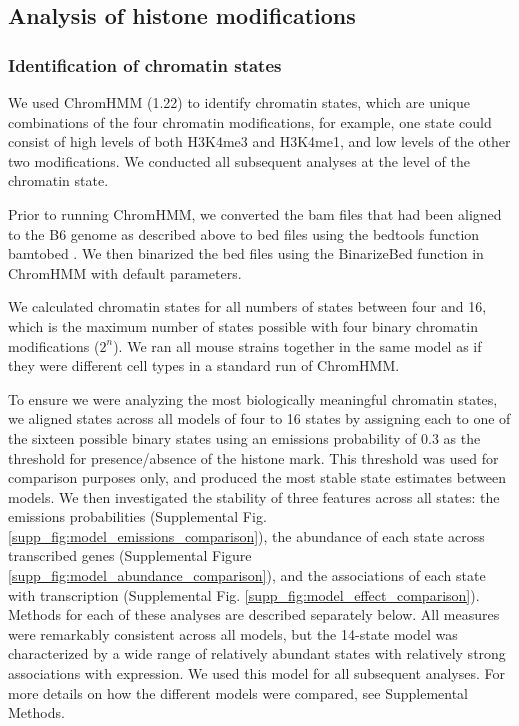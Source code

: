 \documentclass[
  11pt,
]{article}
\begin{document}
\hypertarget{analysis-of-histone-modifications}{%
\subsection{Analysis of histone
modifications}\label{analysis-of-histone-modifications}}

\hypertarget{identification-of-chromatin-states}{%
\subsubsection{Identification of chromatin
states}\label{identification-of-chromatin-states}}

We used ChromHMM (1.22) \citep{pmid29120462} to identify chromatin
states, which are unique combinations of the four chromatin
modifications, for example, one state could consist of high levels of
both H3K4me3 and H3K4me1, and low levels of the other two modifications.
We conducted all subsequent analyses at the level of the chromatin
state.

Prior to running ChromHMM, we converted the bam files that had been
aligned to the B6 genome as described above to bed files using the
bedtools function bamtobed \citep{quinlan2010bedtools}. We then
binarized the bed files using the BinarizeBed function in ChromHMM with
default parameters.

We calculated chromatin states for all numbers of states between four
and 16, which is the maximum number of states possible with four binary
chromatin modifications (\(2^n\)). We ran all mouse strains together in
the same model as if they were different cell types in a standard run of
ChromHMM.

To ensure we were analyzing the most biologically meaningful chromatin
states, we aligned states across all models of four to 16 states by
assigning each to one of the sixteen possible binary states using an
emissions probability of 0.3 as the threshold for presence/absence of
the histone mark. This threshold was used for comparison purposes only,
and produced the most stable state estimates between models. We then
investigated the stability of three features across all states: the
emissions probabilities (Supplemental Fig.
\ref{supp_fig:model_emissions_comparison}), the abundance of each state
across transcribed genes (Supplemental Figure
\ref{supp_fig:model_abundance_comparison}), and the associations of each
state with transcription (Supplemental Fig.
\ref{supp_fig:model_effect_comparison}). Methods for each of these
analyses are described separately below. All measures were remarkably
consistent across all models, but the 14-state model was characterized
by a wide range of relatively abundant states with relatively strong
associations with expression. We used this model for all subsequent
analyses. For more details on how the different models were compared,
see Supplemental Methods.
\end{document}
